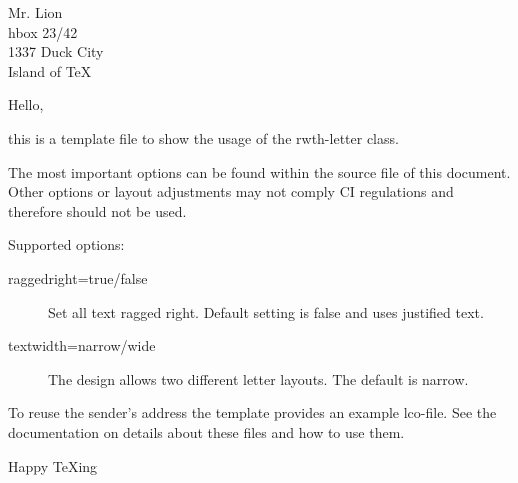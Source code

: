 \documentclass[
	english,%
	parskip=full,%
]{scrartcl}
\begin{document}
\begin{letter}{%
Mr. Lion\\
hbox 23/42\\
1337 Duck City\\
Island of \TeX
}


\opening{Hello,}
this is a template file to show the usage of the rwth-letter class.

The most important options can be found within the source file of this document.
Other options or layout adjustments may not comply CI regulations and therefore  should not be used.

Supported options:\\

\begin{description}
\item[raggedright=true/false] Set all text ragged right. Default setting is false and uses justified text.
\item[textwidth=narrow/wide] The design allows two different letter layouts. The default is narrow.
\end{description}

To reuse the sender's address the template provides an example lco-file.
See the \KOMAScript{} documentation on details about these files and how to use them.

\closing{Happy \TeX{}ing}

\vfil
{}

\end{letter}
\end{document}
